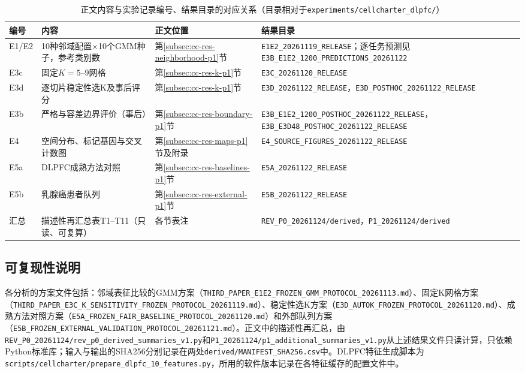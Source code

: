 \begin{table}[htbp]
\centering
\caption{正文内容与实验记录编号、结果目录的对应关系（目录相对于\texttt{experiments/cellcharter\_dlpfc/}）}
\label{tab:cc-record-map-p1}
\small
\begin{tabularx}{\linewidth}{p{1.2cm}Xp{1.8cm}X}
\toprule
编号 & 内容 & 正文位置 & 结果目录\\
\midrule
E1/E2 & 10种邻域配置$\times$10个GMM种子，参考类别数 & 第\ref{subsec:cc-res-neighborhood-p1}节 & \texttt{E1E2\_20261119\_RELEASE}；逐任务预测见\texttt{E3B\_E1E2\_1200\_PREDICTIONS\_20261122}\\
E3c & 固定$K=5$--9网格 & 第\ref{subsec:cc-res-k-p1}节 & \texttt{E3C\_20261120\_RELEASE}\\
E3d & 逐切片稳定性选K及事后评分 & 第\ref{subsec:cc-res-k-p1}节 & \texttt{E3D\_20261122\_RELEASE}，\texttt{E3D\_POSTHOC\_20261122\_RELEASE}\\
E3b & 严格与容差边界评价（事后） & 第\ref{subsec:cc-res-boundary-p1}节 & \texttt{E3B\_E1E2\_1200\_POSTHOC\_20261122\_RELEASE}，\texttt{E3B\_E3D48\_POSTHOC\_20261122\_RELEASE}\\
E4 & 空间分布、标记基因与交叉计数图 & 第\ref{subsec:cc-res-maps-p1}节及附录 & \texttt{E4\_SOURCE\_FIGURES\_20261122\_RELEASE}\\
E5a & DLPFC成熟方法对照 & 第\ref{subsec:cc-res-baselines-p1}节 & \texttt{E5A\_20261122\_RELEASE}\\
E5b & 乳腺癌患者队列 & 第\ref{subsec:cc-res-external-p1}节 & \texttt{E5B\_20261122\_RELEASE}\\
汇总 & 描述性再汇总表T1--T11（只读、可复算） & 各节表注 & \texttt{REV\_P0\_20261124/derived}，\texttt{P1\_20261124/derived}\\
\bottomrule
\end{tabularx}
\end{table}

\subsection{可复现性说明}
各分析的方案文件包括：邻域表征比较的GMM方案（\texttt{THIRD\_PAPER\_E1E2\_FROZEN\_GMM\_PROTOCOL\_20261113.md}）、固定K网格方案（\texttt{THIRD\_PAPER\_E3C\_K\_SENSITIVITY\_FROZEN\_PROTOCOL\_20261119.md}）、稳定性选K方案（\texttt{E3D\_AUTOK\_FROZEN\_PROTOCOL\_20261120.md}）、成熟方法对照方案（\texttt{E5A\_FROZEN\_FAIR\_BASELINE\_PROTOCOL\_20261120.md}）和外部队列方案（\texttt{E5B\_FROZEN\_EXTERNAL\_VALIDATION\_PROTOCOL\_20261121.md}）。正文中的描述性再汇总，由\texttt{REV\_P0\_20261124/rev\_p0\_derived\_summaries\_v1.py}和\texttt{P1\_20261124/p1\_additional\_summaries\_v1.py}从上述结果文件只读计算，只依赖Python标准库；输入与输出的SHA256分别记录在两处\texttt{derived/MANIFEST\_SHA256.csv}中。DLPFC特征生成脚本为\texttt{scripts/cellcharter/prepare\_dlpfc\_10\_features.py}，所用的软件版本记录在各特征缓存的配置文件中。
